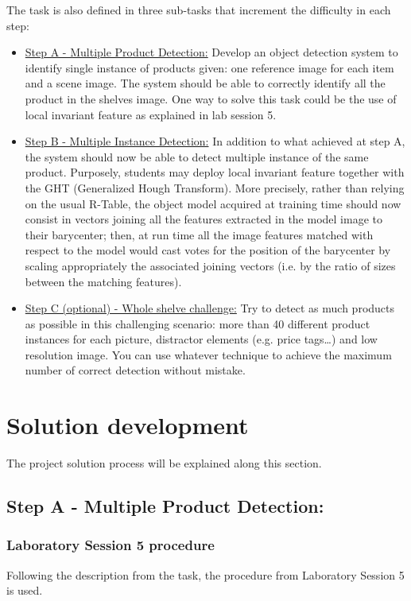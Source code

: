 \documentclass[12pt]{article}
\begin{document}
The task is also defined in three sub-tasks that increment the difficulty in each step:

\begin{itemize}
	\item \underline{Step A - Multiple Product Detection:} Develop an object detection system to identify single instance of products given: one reference image for
each item and a scene image. The system should be able to correctly identify all the product in the shelves
image. One way to solve this task could be the use of local invariant feature as explained in lab session 5.
	\item \underline{Step B - Multiple Instance Detection:} In addition to what achieved at step A, the system should now be able to detect multiple instance of the
same product. Purposely, students may deploy local invariant feature together with the GHT (Generalized
Hough Transform). More precisely, rather than relying on the usual R-Table, the object model acquired at
training time should now consist in vectors joining all the features extracted in the model image to their
barycenter; then, at run time all the image features matched with respect to the model would cast votes
for the position of the barycenter by scaling appropriately the associated joining vectors (i.e. by the ratio of
sizes between the matching features). 
	\item \underline{Step C (optional) - Whole shelve challenge:} Try to detect as much products as possible in this challenging scenario: more than 40 different product
instances for each picture, distractor elements (e.g. price tags…) and low resolution image. You can use
whatever technique to achieve the maximum number of correct detection without mistake.

\end{itemize}
\section{Solution development}
The project solution process will be explained along this section. 

\subsection{Step A - Multiple Product Detection:}
\label{StepA}

\subsubsection{Laboratory Session 5 procedure}
Following the description from the task, the procedure from Laboratory Session 5 is used.\\
\end{document}

